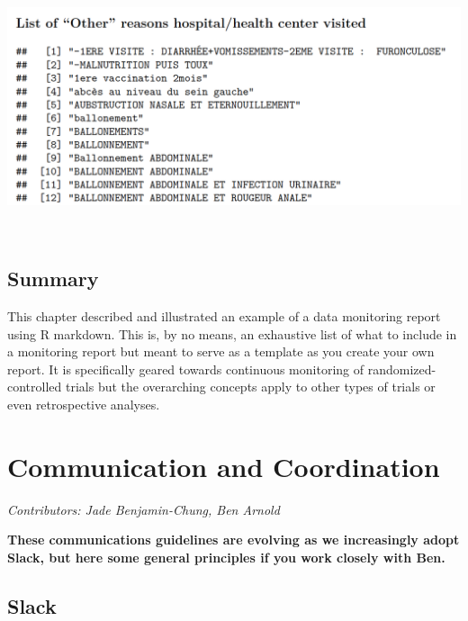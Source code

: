 \documentclass[
]{book}
\begin{document}
\includegraphics[width=0.7\linewidth,height=0.5\textheight]{images/report-images/appendix}

\(~\)

\section{Summary}\label{summary}

This chapter described and illustrated an example of a data monitoring report using R markdown. This is, by no means, an exhaustive list of what to include in a monitoring report but meant to serve as a template as you create your own report. It is specifically geared towards continuous monitoring of randomized-controlled trials but the overarching concepts apply to other types of trials or even retrospective analyses.

\chapter{Communication and Coordination}\label{commcoord}

\emph{Contributors: Jade Benjamin-Chung, Ben Arnold}

\textbf{These communications guidelines are evolving as we increasingly adopt Slack, but here some general principles if you work closely with Ben.}

\section{Slack}\label{slack}
\end{document}
